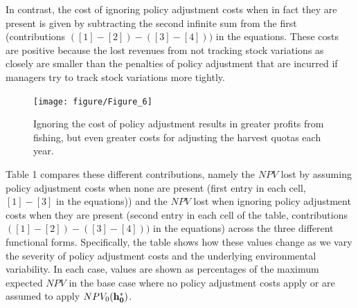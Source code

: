 \documentclass{article}\usepackage[]{graphicx}\usepackage[]{color}
\makeatletter
\newenvironment{kframe}{%
 \def\at@end@of@kframe{}%
 \ifinner\ifhmode%
  \def\at@end@of@kframe{\end{minipage}}%
  \begin{minipage}{\columnwidth}%
 \fi\fi%
 \def\FrameCommand##1{\hskip\@totalleftmargin \hskip-\fboxsep
 \colorbox{shadecolor}{##1}\hskip-\fboxsep
     \hskip-\linewidth \hskip-\@totalleftmargin \hskip\columnwidth}%
 \MakeFramed {\advance\hsize-\width
   \@totalleftmargin\z@ \linewidth\hsize
   \@setminipage}}%
 {\par\unskip\endMakeFramed%
 \at@end@of@kframe}
\newenvironment{knitrout}{}{} %
\makeatother
\begin{document}
In contrast, the cost of ignoring policy adjustment costs when in fact they are present is given by subtracting the second infinite sum from the first (contributions $([1]-[2])-([3]-[4]))$ in the equations. These costs are positive because the lost revenues from not tracking stock variations as closely are smaller than the penalties of policy adjustment that are incurred if managers try to track stock variations more tightly.

\begin{figure}
\begin{knitrout}
\color{fgcolor}\begin{kframe}


{\ttfamily\noindent\itshape\color{messagecolor}{\#\# Using\ \ as id variables}}\end{kframe}
\texttt{[image: figure/Figure\_6]} 

\end{knitrout}


\caption{Ignoring the cost of policy adjustment results in greater profits from fishing, but even greater costs for adjusting the harvest quotas each year.}
\end{figure}








Table 1 compares these different contributions, namely the $NPV$ lost by assuming policy adjustment costs when none are present (first entry in each cell, $[1]-[3]$ in the equations)) and the $NPV$ lost when ignoring policy adjustment costs when they are present (second entry in each cell of the table, contributions $([1]-[2])-([3]-[4]))$ in the equations) across the three different functional forms. Specifically, the table shows how these values change as we vary the severity of policy adjustment costs and the underlying environmental variability. In each case, values are shown as percentages of the maximum expected $NPV$ in the base case where no policy adjustment costs apply or are assumed to apply $NPV_0({\bf h_0^*})$.
\end{document}
